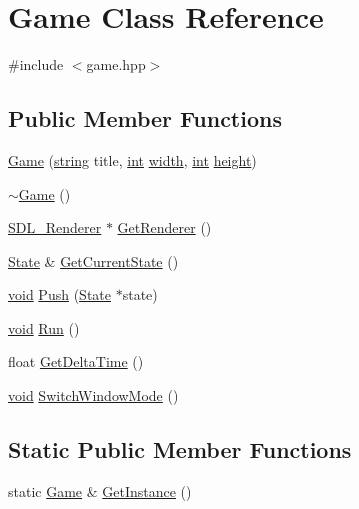 \hypertarget{class_game}{\section{Game Class Reference}
\label{class_game}
}


{\ttfamily \#include $<$game.\-hpp$>$}

\subsection*{Public Member Functions}
\begin{DoxyCompactItemize}
\item 
\hyperlink{class_game_aab0e29e910c384ad47ec221c530a6921}{Game} (\hyperlink{_s_d_l__opengl__glext_8h_ae84541b4f3d8e1ea24ec0f466a8c568b}{string} title, \hyperlink{_s_d_l__thread_8h_a6a64f9be4433e4de6e2f2f548cf3c08e}{int} \hyperlink{_s_d_l__opengl_8h_a9a82cf3caff84cabc4598e2619faac17}{width}, \hyperlink{_s_d_l__thread_8h_a6a64f9be4433e4de6e2f2f548cf3c08e}{int} \hyperlink{_s_d_l__opengl_8h_aa352f2804b9902ac30769c00dde75d5f}{height})
\item 
\hyperlink{class_game_ae3d112ca6e0e55150d2fdbc704474530}{$\sim$\-Game} ()
\item 
\hyperlink{_s_d_l__render_8h_aaf0bf7d020754fc614fe06552ea4d5d4}{S\-D\-L\-\_\-\-Renderer} $\ast$ \hyperlink{class_game_a258a5c5dc8fcb42562ce22338f355e7d}{Get\-Renderer} ()
\item 
\hyperlink{class_state}{State} \& \hyperlink{class_game_a3b8edf9c81174c4ea74fbfe83b301f53}{Get\-Current\-State} ()
\item 
\hyperlink{_s_d_l__opengles2__gl2ext_8h_ae5d8fa23ad07c48bb609509eae494c95}{void} \hyperlink{class_game_ab5637c16d9580f8ec08b5830baff35bd}{Push} (\hyperlink{class_state}{State} $\ast$state)
\item 
\hyperlink{_s_d_l__opengles2__gl2ext_8h_ae5d8fa23ad07c48bb609509eae494c95}{void} \hyperlink{class_game_a96341ca5b54d90adc3ecb3bf0bcd2312}{Run} ()
\item 
float \hyperlink{class_game_a3302940d7cdc04bfa5690d10138db4f3}{Get\-Delta\-Time} ()
\item 
\hyperlink{_s_d_l__opengles2__gl2ext_8h_ae5d8fa23ad07c48bb609509eae494c95}{void} \hyperlink{class_game_a3995bcde60ad3839bb4bc6c265efe035}{Switch\-Window\-Mode} ()
\end{DoxyCompactItemize}
\subsection*{Static Public Member Functions}
\begin{DoxyCompactItemize}
\item 
static \hyperlink{class_game}{Game} \& \hyperlink{class_game_a689dc1143da4a51248eb9feeed5b2aba}{Get\-Instance} ()
\end{DoxyCompactItemize}

